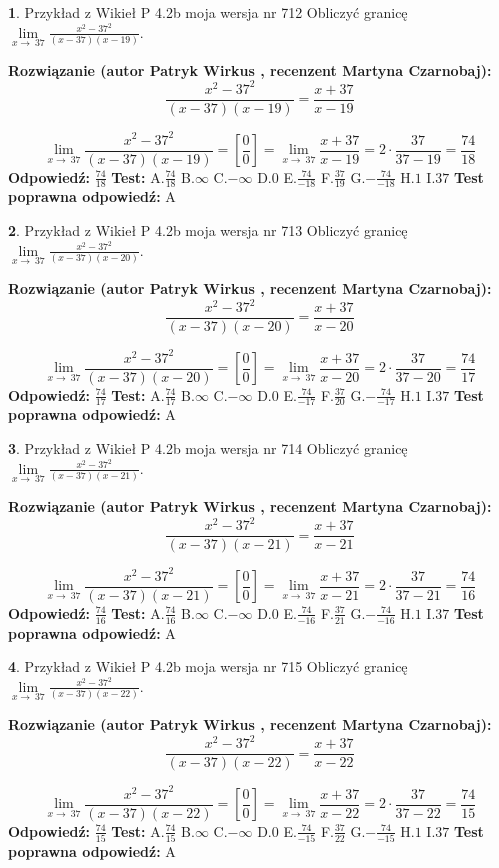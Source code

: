 \documentclass[12pt, a4paper]{article}
\theoremstyle{definition} %
\newtheorem{zad}{}
\newcommand{\zadStart}[1]{\begin{zad}#1\newline}
\newcommand{\zadStop}{\end{zad}}
\newcommand{\rozwStart}[2]{\noindent \textbf{Rozwiązanie (autor #1 , recenzent #2): }\newline}
\newcommand{\rozwStop}{\newline}
\newcommand{\odpStart}{\noindent \textbf{Odpowiedź:}\newline}
\newcommand{\odpStop}{\newline}
\newcommand{\testStart}{\noindent \textbf{Test:}\newline}
\newcommand{\testStop}{\newline}
\newcommand{\kluczStart}{\noindent \textbf{Test poprawna odpowiedź:}\newline}
\newcommand{\kluczStop}{\newline}
\begin{document}
\zadStart{Przykład z Wikieł P 4.2b moja wersja nr 712}
Obliczyć granicę $\lim\limits_{x\to\ 37}\frac{x^{2}-37^{2}}{(x-37)(x-19)}$.
\zadStop
\rozwStart{Patryk Wirkus}{Martyna Czarnobaj}
$$\frac{x^{2}-37^{2}}{(x-37)(x-19)}=\frac{x+37}{x-19}$$

$$\lim\limits_{x\to\ 37}\frac{x^{2}-37^{2}}{(x-37)(x-19)}=[\frac{0}{0}]=\lim\limits_{x\to\ 37}\frac{x+37}{x-19}=2 \cdot \frac{37}{37-19} = \frac{74}{18}$$
\rozwStop
\odpStart
$\frac{74}{18}$
\odpStop
\testStart
A.$\frac{74}{18}$
B.$\infty$
C.$-\infty$
D.$0$
E.$\frac{74}{-18}$
F.$\frac{37}{19}$
G.$-\frac{74}{-18}$
H.$1$
I.$37$
\testStop
\kluczStart
A
\kluczStop



\zadStart{Przykład z Wikieł P 4.2b moja wersja nr 713}
Obliczyć granicę $\lim\limits_{x\to\ 37}\frac{x^{2}-37^{2}}{(x-37)(x-20)}$.
\zadStop
\rozwStart{Patryk Wirkus}{Martyna Czarnobaj}
$$\frac{x^{2}-37^{2}}{(x-37)(x-20)}=\frac{x+37}{x-20}$$

$$\lim\limits_{x\to\ 37}\frac{x^{2}-37^{2}}{(x-37)(x-20)}=[\frac{0}{0}]=\lim\limits_{x\to\ 37}\frac{x+37}{x-20}=2 \cdot \frac{37}{37-20} = \frac{74}{17}$$
\rozwStop
\odpStart
$\frac{74}{17}$
\odpStop
\testStart
A.$\frac{74}{17}$
B.$\infty$
C.$-\infty$
D.$0$
E.$\frac{74}{-17}$
F.$\frac{37}{20}$
G.$-\frac{74}{-17}$
H.$1$
I.$37$
\testStop
\kluczStart
A
\kluczStop



\zadStart{Przykład z Wikieł P 4.2b moja wersja nr 714}
Obliczyć granicę $\lim\limits_{x\to\ 37}\frac{x^{2}-37^{2}}{(x-37)(x-21)}$.
\zadStop
\rozwStart{Patryk Wirkus}{Martyna Czarnobaj}
$$\frac{x^{2}-37^{2}}{(x-37)(x-21)}=\frac{x+37}{x-21}$$

$$\lim\limits_{x\to\ 37}\frac{x^{2}-37^{2}}{(x-37)(x-21)}=[\frac{0}{0}]=\lim\limits_{x\to\ 37}\frac{x+37}{x-21}=2 \cdot \frac{37}{37-21} = \frac{74}{16}$$
\rozwStop
\odpStart
$\frac{74}{16}$
\odpStop
\testStart
A.$\frac{74}{16}$
B.$\infty$
C.$-\infty$
D.$0$
E.$\frac{74}{-16}$
F.$\frac{37}{21}$
G.$-\frac{74}{-16}$
H.$1$
I.$37$
\testStop
\kluczStart
A
\kluczStop



\zadStart{Przykład z Wikieł P 4.2b moja wersja nr 715}
Obliczyć granicę $\lim\limits_{x\to\ 37}\frac{x^{2}-37^{2}}{(x-37)(x-22)}$.
\zadStop
\rozwStart{Patryk Wirkus}{Martyna Czarnobaj}
$$\frac{x^{2}-37^{2}}{(x-37)(x-22)}=\frac{x+37}{x-22}$$

$$\lim\limits_{x\to\ 37}\frac{x^{2}-37^{2}}{(x-37)(x-22)}=[\frac{0}{0}]=\lim\limits_{x\to\ 37}\frac{x+37}{x-22}=2 \cdot \frac{37}{37-22} = \frac{74}{15}$$
\rozwStop
\odpStart
$\frac{74}{15}$
\odpStop
\testStart
A.$\frac{74}{15}$
B.$\infty$
C.$-\infty$
D.$0$
E.$\frac{74}{-15}$
F.$\frac{37}{22}$
G.$-\frac{74}{-15}$
H.$1$
I.$37$
\testStop
\kluczStart
A
\kluczStop
\end{document}
